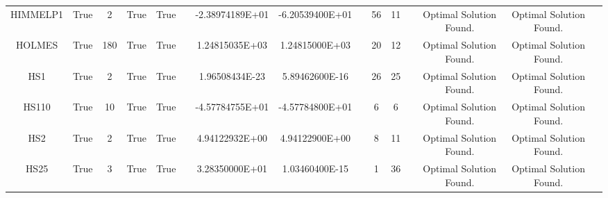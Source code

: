 \begin{longtable}{ccccccccccccccc}
	\cellcolor{default2} HIMMELP1& \cellcolor{default2} True& \cellcolor{default2} 2& \cellcolor{default2} True& \cellcolor{default2} True& \cellcolor{header} & \cellcolor{poor} -2.38974189E+01& \cellcolor{best} -6.20539400E+01& \cellcolor{header} & \cellcolor{poor} 56& \cellcolor{best} 11& \cellcolor{header} & \cellcolor{default2} Optimal Solution Found.& \cellcolor{default2} Optimal Solution Found.& \cellcolor{header} \\
	\cellcolor{default1} HOLMES& \cellcolor{default1} True& \cellcolor{default1} 180& \cellcolor{default1} True& \cellcolor{default1} True& \cellcolor{header} & \cellcolor{ok} 1.24815035E+03& \cellcolor{best} 1.24815000E+03& \cellcolor{header} & \cellcolor{ok} 20& \cellcolor{best} 12& \cellcolor{header} & \cellcolor{default1} Optimal Solution Found.& \cellcolor{default1} Optimal Solution Found.& \cellcolor{header} \\
	\cellcolor{default2} HS1& \cellcolor{default2} True& \cellcolor{default2} 2& \cellcolor{default2} True& \cellcolor{default2} True& \cellcolor{header} & \cellcolor{best} 1.96508434E-23& \cellcolor{ok} 5.89462600E-16& \cellcolor{header} & \cellcolor{ok} 26& \cellcolor{best} 25& \cellcolor{header} & \cellcolor{default2} Optimal Solution Found.& \cellcolor{default2} Optimal Solution Found.& \cellcolor{header} \\
	\cellcolor{default1} HS110& \cellcolor{default1} True& \cellcolor{default1} 10& \cellcolor{default1} True& \cellcolor{default1} True& \cellcolor{header} & \cellcolor{ok} -4.57784755E+01& \cellcolor{best} -4.57784800E+01& \cellcolor{header} & \cellcolor{best} 6& \cellcolor{best} 6& \cellcolor{header} & \cellcolor{default1} Optimal Solution Found.& \cellcolor{default1} Optimal Solution Found.& \cellcolor{header} \\
	\cellcolor{default2} HS2& \cellcolor{default2} True& \cellcolor{default2} 2& \cellcolor{default2} True& \cellcolor{default2} True& \cellcolor{header} & \cellcolor{ok} 4.94122932E+00& \cellcolor{best} 4.94122900E+00& \cellcolor{header} & \cellcolor{best} 8& \cellcolor{ok} 11& \cellcolor{header} & \cellcolor{default2} Optimal Solution Found.& \cellcolor{default2} Optimal Solution Found.& \cellcolor{header} \\
	\cellcolor{default1} HS25& \cellcolor{default1} True& \cellcolor{default1} 3& \cellcolor{default1} True& \cellcolor{default1} True& \cellcolor{header} & \cellcolor{poor} 3.28350000E+01& \cellcolor{best} 1.03460400E-15& \cellcolor{header} & \cellcolor{best} 1& \cellcolor{poor} 36& \cellcolor{header} & \cellcolor{default1} Optimal Solution Found.& \cellcolor{default1} Optimal Solution Found.& \cellcolor{header} \\

\end{longtable}
